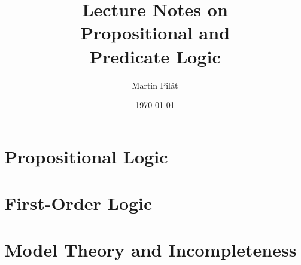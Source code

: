 \documentclass[a4paper,nofonts,justified,colorinlistoftodos,hidelinks]{tufte-book}
\title{Lecture Notes on \\ Propositional and \\ Predicate Logic}
\author{Martin Pilát}
\date{\today}
\begin{document}
\maketitle

\mainmatter



\part{Propositional Logic}



\part{First-Order Logic}



\part{Model Theory and Incompleteness}



\backmatter

\setcounter{tocdepth}{2}
\tableofcontents
\listoffigures
\listoftables
\listofalgorithms 
\listoftodos
\end{document}
